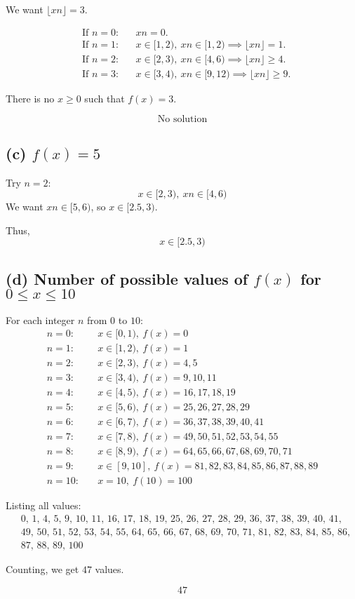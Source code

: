 \documentclass{article}
\begin{document}
We want $\lfloor x n \rfloor = 3$.

\begin{align*}
&\text{If } n = 0: && x n = 0. \\
&\text{If } n = 1: && x \in [1,2),\ x n \in [1,2) \implies \lfloor x n \rfloor = 1. \\
&\text{If } n = 2: && x \in [2,3),\ x n \in [4,6) \implies \lfloor x n \rfloor \ge 4. \\
&\text{If } n = 3: && x \in [3,4),\ x n \in [9,12) \implies \lfloor x n \rfloor \ge 9.
\end{align*}

There is no $x \ge 0$ such that $f(x) = 3$.

\[
\boxed{\text{No solution}}
\]

\subsection*{(c) $f(x) = 5$}

Try $n = 2$:
\[
x \in [2,3),\ x n \in [4,6)
\]
We want $x n \in [5,6)$, so $x \in [2.5,3)$.

Thus,
\[
\boxed{x \in [2.5,3)}
\]

\subsection*{(d) Number of possible values of $f(x)$ for $0 \le x \le 10$}

For each integer $n$ from $0$ to $10$:
\begin{align*}
n = 0: &\quad x \in [0,1),\ f(x) = 0 \\
n = 1: &\quad x \in [1,2),\ f(x) = 1 \\
n = 2: &\quad x \in [2,3),\ f(x) = 4,5 \\
n = 3: &\quad x \in [3,4),\ f(x) = 9,10,11 \\
n = 4: &\quad x \in [4,5),\ f(x) = 16,17,18,19 \\
n = 5: &\quad x \in [5,6),\ f(x) = 25,26,27,28,29 \\
n = 6: &\quad x \in [6,7),\ f(x) = 36,37,38,39,40,41 \\
n = 7: &\quad x \in [7,8),\ f(x) = 49,50,51,52,53,54,55 \\
n = 8: &\quad x \in [8,9),\ f(x) = 64,65,66,67,68,69,70,71 \\
n = 9: &\quad x \in [9,10],\ f(x) = 81,82,83,84,85,86,87,88,89 \\
n = 10: &\quad x = 10,\ f(10) = 100
\end{align*}

Listing all values:
\[
\begin{aligned}
&0,\,1,\,4,\,5,\,9,\,10,\,11,\,16,\,17,\,18,\,19,\,25,\,26,\,27,\,28,\,29,\,36,\,37,\,38,\,39,\,40,\,41,\\
&49,\,50,\,51,\,52,\,53,\,54,\,55,\,64,\,65,\,66,\,67,\,68,\,69,\,70,\,71,\,81,\,82,\,83,\,84,\,85,\,86,\\
&87,\,88,\,89,\,100
\end{aligned}
\]

Counting, we get $47$ values.

\[
\boxed{47}
\]
\end{document}
